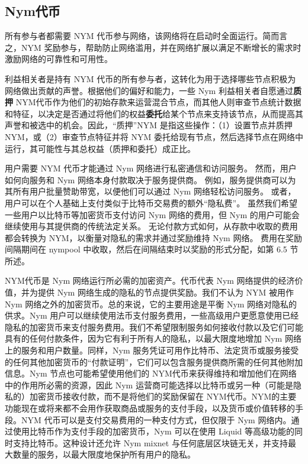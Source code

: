 \documentclass{article}
\begin{document}
	\subsection{Nym代币}

	所有参与者都需要 NYM 代币参与网络，该网络将在启动时全面运行。简而言之，NYM 奖励参与，帮助防止网络滥用，并在网络扩展以满足不断增长的需求时激励网络的可靠性和可用性。\newline

	利益相关者是持有 NYM 代币的所有参与者，这转化为用于选择哪些节点积极为网络做出贡献的声誉。根据他们的偏好和能力，一些 Nym 利益相关者自愿通过\textbf{质押} NYM代币作为他们的初始存款来运营混合节点，而其他人则审查节点统计数据和特征，以决定是否通过将他们的权益\textbf{委托}给某个节点来支持该节点，从而提高其声誉和被选中的机会。因此，“质押”NYM 是指这些操作：（1）设置节点并质押 NYM，或（2）审查节点特征并将 NYM 委托给现有节点，然后选择节点在网络中运行，其可能性与其总权益（质押和委托）成正比。\newline

	用户需要 NYM 代币才能通过 Nym 网络进行私密通信和访问服务。 然而，用户如何向服务和 Nym 网络本身付款取决于服务提供商。 例如，服务提供商可以为其所有用户批量赞助带宽，以便他们可以通过 Nym 网络轻松访问服务。 或者，用户可以在个人基础上支付类似于比特币交易费的额外“隐私费”。 虽然我们希望一些用户以比特币等加密货币支付访问 Nym 网络的费用，但 Nym 的用户可能会继续使用与其提供商的传统法定关系。 无论付款方式如何，从存款中收取的费用都会转换为 NYM，以衡量对隐私的需求并通过奖励维持 Nym 网络。 费用在奖励间隔期间在 nympool 中收取，然后在间隔结束时以奖励的形式分配，如第 6.5 节所述。\newline

	NYM代币是 Nym 网络运行所必需的加密资产。代币代表 Nym 网络提供的经济价值，并为提供 Nym 网络生成的隐私的节点提供奖励。我们不认为 NYM 被用作 Nym 网络之外的加密货币。总的来说，它的主要用途是平衡 Nym 网络对隐私的供求。Nym 用户可以继续使用法币支付服务费用，一些高级用户更愿意使用已经隐私的加密货币来支付服务费用。我们不希望限制服务如何接收付款以及它们可能具有的任何付款条件，因为它有利于所有人的隐私，以最大限度地增加 Nym 网络上的服务和用户数量。同样，Nym 服务凭证可用作比特币、法定货币或服务接受的任何其他加密货币的“付款证明”，它们可以包含服务提供商所需的任何其他附加信息。Nym 节点也可能希望使用他们的 NYM代币来获得维持和增加他们在网络中的作用所必需的资源，因此 Nym 运营商可能选择以比特币或另一种（可能是隐私的）加密货币接收付款，而不是将他们的奖励保留在 NYM代币。NYM的主要功能现在或将来都不会用作获取商品或服务的支付手段，以及货币或价值转移的手段。NYM 代币可以是支付交易费用的一种支付方式，但仅限于 Nym 网络内。通过使用比特币作为支付手段的加密货币，Nym 可以在使用 Liquid \cite{ref3} 等高级功能的同时支持比特币。这种设计还允许 Nym mixnet 与任何底层区块链无关，并支持最大数量的服务，以最大限度地保护所有用户的隐私。\newline
\end{document}
